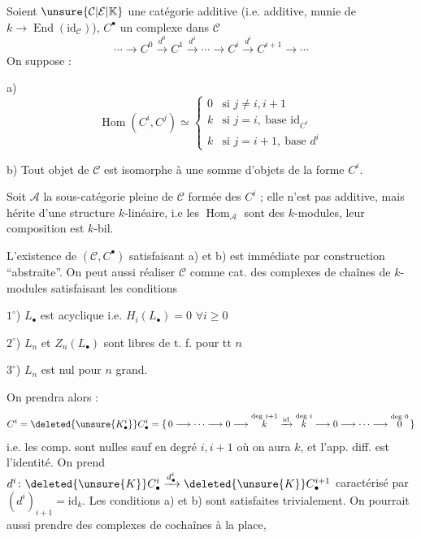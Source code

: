 Soient  $\unsure{\mathcal C|\mathcal E|\mathbb K}$ une catégorie additive (i.e. additive, munie
de $k\to\operatorname{End}(\mathrm{id}_{\mathcal C})$), $C^\bullet$ un complexe  dans
$\mathcal C$
\[
 \cdots\longrightarrow C^0\xrightarrow{d^0}C^1\xrightarrow{d^1}
 \cdots\longrightarrow C^i\xrightarrow{d^i}C^{i+1}\longrightarrow\cdots
\]
On suppose :

a)
\[
\operatorname{Hom}(C^i,C^j)\simeq
\begin{cases}
0&\text{si }j\ne i,i+1\\
k&\text{si }j=i,\ \text{base }\mathrm{id}_{C^i}\\
k&\text{si }j=i+1,\ \text{base }d^i
\end{cases}
\]

b) Tout objet de $\mathcal C$ est isomorphe à une
somme  d'objets de la forme $C^i$.

Soit $\mathcal A$ la sous-catégorie pleine de $\mathcal C$
formée des \deleted{$\unsure{\Phi}$} $C^i$ ; elle n'est pas additive,
mais hérite d'une structure $k$-linéaire,
i.e les $\operatorname{Hom}_{\mathcal A}$ sont des $k$-modules, leur
composition est $k$-bil.

 L'existence de $(\mathcal C,C^\bullet)$ satisfaisant a) et
b) est immédiate par construction ``abstraite''.
On peut aussi réaliser $\mathcal C$ comme  cat.  des
complexes de chaînes  de $k$-modules
satisfaisant les conditions

$1^\circ$)  $L_{\bullet}$ est acyclique i.e. $H_i(L_{\bullet})=0$ $\forall i\geq0$

$2^\circ$) $L_n$ et $Z_n(L_{\bullet})$ sont libres de t. f. pour tt $n$

$3^\circ$) $L_n$ est nul pour $n$ grand.

On prendra alors :
\[
 C^i=\deleted{\unsure{K^i_{\bullet}}} C^i_{\bullet}=
 \{\,0\longrightarrow\cdots\longrightarrow0\longrightarrow
 \overset{\text{deg }i+1}{k}\xrightarrow{\mathrm{id}}
 \overset{\text{deg }i}{k}\longrightarrow0\longrightarrow\cdots\longrightarrow
 \overset{\text{deg }0}{0}\,\}
\]
i.e. les comp. sont nulles sauf en degré $i,i+1$ où on
aura $k$, et l'app. diff.  est l'identité.
On prend $d^i\colon \deleted{\unsure{K}}C^i_{\bullet}\xrightarrow{d^i_{\bullet}}
\deleted{\unsure{K}}C^{i+1}_{\bullet}$ caractérisé
par $(d^i)_{i+1}=\mathrm{id}_k$. Les conditions a) et b) sont
satisfaites trivialement. On pourrait aussi
prendre des complexes de cochaînes à la place,
